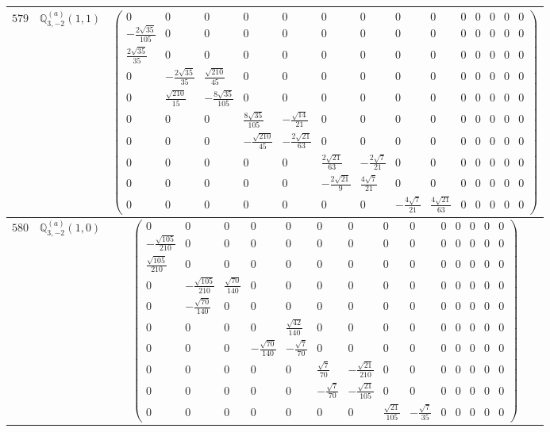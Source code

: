 \documentclass[fleqn,8pt,landscape]{jsarticle}
\begin{document}
\begin{center}
\begin{longtable}{ccc}
$ 579 $ & $ \mathbb{Q}_{3,-2}^{(a)}(1,1) $ & $ \begin{pmatrix} 0 & 0 & 0 & 0 & 0 & 0 & 0 & 0 & 0 & 0 & 0 & 0 & 0 & 0 \\ - \frac{2 \sqrt{35}}{105} & 0 & 0 & 0 & 0 & 0 & 0 & 0 & 0 & 0 & 0 & 0 & 0 & 0 \\ \frac{2 \sqrt{35}}{35} & 0 & 0 & 0 & 0 & 0 & 0 & 0 & 0 & 0 & 0 & 0 & 0 & 0 \\ 0 & - \frac{2 \sqrt{35}}{35} & \frac{\sqrt{210}}{45} & 0 & 0 & 0 & 0 & 0 & 0 & 0 & 0 & 0 & 0 & 0 \\ 0 & \frac{\sqrt{210}}{15} & - \frac{8 \sqrt{35}}{105} & 0 & 0 & 0 & 0 & 0 & 0 & 0 & 0 & 0 & 0 & 0 \\ 0 & 0 & 0 & \frac{8 \sqrt{35}}{105} & - \frac{\sqrt{14}}{21} & 0 & 0 & 0 & 0 & 0 & 0 & 0 & 0 & 0 \\ 0 & 0 & 0 & - \frac{\sqrt{210}}{45} & - \frac{2 \sqrt{21}}{63} & 0 & 0 & 0 & 0 & 0 & 0 & 0 & 0 & 0 \\ 0 & 0 & 0 & 0 & 0 & \frac{2 \sqrt{21}}{63} & - \frac{2 \sqrt{7}}{21} & 0 & 0 & 0 & 0 & 0 & 0 & 0 \\ 0 & 0 & 0 & 0 & 0 & - \frac{2 \sqrt{21}}{9} & \frac{4 \sqrt{7}}{21} & 0 & 0 & 0 & 0 & 0 & 0 & 0 \\ 0 & 0 & 0 & 0 & 0 & 0 & 0 & - \frac{4 \sqrt{7}}{21} & \frac{4 \sqrt{21}}{63} & 0 & 0 & 0 & 0 & 0 \end{pmatrix} $ \\ \hline
$ 580 $ & $ \mathbb{Q}_{3,-2}^{(a)}(1,0) $ & $ \begin{pmatrix} 0 & 0 & 0 & 0 & 0 & 0 & 0 & 0 & 0 & 0 & 0 & 0 & 0 & 0 \\ - \frac{\sqrt{105}}{210} & 0 & 0 & 0 & 0 & 0 & 0 & 0 & 0 & 0 & 0 & 0 & 0 & 0 \\ \frac{\sqrt{105}}{210} & 0 & 0 & 0 & 0 & 0 & 0 & 0 & 0 & 0 & 0 & 0 & 0 & 0 \\ 0 & - \frac{\sqrt{105}}{210} & \frac{\sqrt{70}}{140} & 0 & 0 & 0 & 0 & 0 & 0 & 0 & 0 & 0 & 0 & 0 \\ 0 & - \frac{\sqrt{70}}{140} & 0 & 0 & 0 & 0 & 0 & 0 & 0 & 0 & 0 & 0 & 0 & 0 \\ 0 & 0 & 0 & 0 & \frac{\sqrt{42}}{140} & 0 & 0 & 0 & 0 & 0 & 0 & 0 & 0 & 0 \\ 0 & 0 & 0 & - \frac{\sqrt{70}}{140} & - \frac{\sqrt{7}}{70} & 0 & 0 & 0 & 0 & 0 & 0 & 0 & 0 & 0 \\ 0 & 0 & 0 & 0 & 0 & \frac{\sqrt{7}}{70} & - \frac{\sqrt{21}}{210} & 0 & 0 & 0 & 0 & 0 & 0 & 0 \\ 0 & 0 & 0 & 0 & 0 & - \frac{\sqrt{7}}{70} & - \frac{\sqrt{21}}{105} & 0 & 0 & 0 & 0 & 0 & 0 & 0 \\ 0 & 0 & 0 & 0 & 0 & 0 & 0 & \frac{\sqrt{21}}{105} & - \frac{\sqrt{7}}{35} & 0 & 0 & 0 & 0 & 0 \end{pmatrix} $ \\ \hline

\end{longtable}
\end{center}
\end{document}
